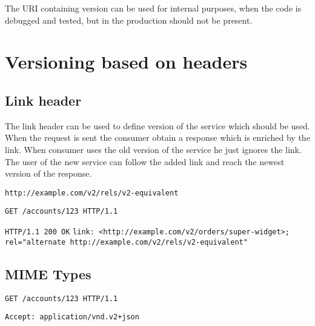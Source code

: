 The URI containing version can be used for internal purposes, when the code is debugged and tested, but in the production should not be present.

\section{Versioning based on headers}
\subsection{Link header}
The link header can be used to define version of the service which should be used. When the request is sent the consumer obtain a response which is enriched by the link. When consumer uses the old version of the service he just ignores the link. The user of the new service can follow the added link and reach the newest version of the response.

\texttt{http://example.com/v2/rels/v2-equivalent}

\texttt{GET /accounts/123 HTTP/1.1}

\texttt{HTTP/1.1 200 OK}
\texttt{link: <http://example.com/v2/orders/super-widget>; rel="alternate http://example.com/v2/rels/v2-equivalent"}


\subsection{MIME Types}

\texttt{GET /accounts/123 HTTP/1.1}

\texttt{Accept: application/vnd.v2+json}
